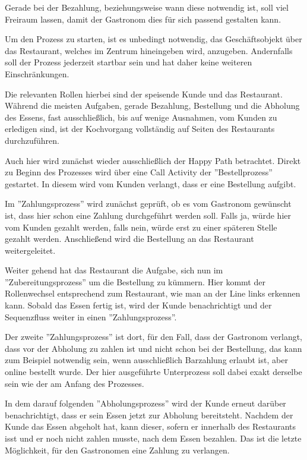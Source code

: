 Gerade bei der Bezahlung, beziehungsweise wann diese notwendig ist, soll viel Freiraum lassen, damit der Gastronom dies für sich passend gestalten kann.

Um den Prozess zu starten, ist es unbedingt notwendig, das Geschäftsobjekt über das Restaurant, welches im Zentrum hineingeben wird, anzugeben. Andernfalls soll der Prozess jederzeit startbar sein und hat daher keine weiteren Einschränkungen.

Die relevanten Rollen hierbei sind der speisende Kunde und das Restaurant.
Während die meisten Aufgaben, gerade Bezahlung, Bestellung und die Abholung des Essens, fast ausschließlich, bis auf wenige Ausnahmen, vom Kunden zu erledigen sind, ist der Kochvorgang vollständig auf Seiten des Restaurants durchzuführen.

\clearpage
{}

Auch hier wird zunächst wieder ausschließlich der Happy Path betrachtet. Direkt zu Beginn des Prozesses wird über eine Call Activity der ''Bestellprozess'' gestartet. In diesem wird vom Kunden verlangt, dass er eine Bestellung aufgibt. 

Im ''Zahlungsprozess'' wird zunächst geprüft, ob es vom Gastronom gewünscht ist, dass hier schon eine Zahlung durchgeführt werden soll. Falls ja, würde hier vom Kunden gezahlt werden, falls nein, würde erst zu einer späteren Stelle gezahlt werden. Anschließend wird die Bestellung an das Restaurant weitergeleitet.

Weiter gehend hat das Restaurant die Aufgabe, sich nun im ''Zubereitungsprozess'' um die Bestellung zu kümmern. Hier kommt der Rollenwechsel entsprechend zum Restaurant, wie man an der Line links erkennen kann. Sobald das Essen fertig ist, wird der Kunde benachrichtigt und der Sequenzfluss weiter in einen ''Zahlungsprozess''. 

Der zweite ''Zahlungsprozess'' ist dort, für den Fall, dass der Gastronom verlangt, dass vor der Abholung zu zahlen ist und nicht schon bei der Bestellung, das kann zum Beispiel notwendig sein, wenn ausschließlich Barzahlung erlaubt ist, aber online bestellt wurde. Der hier ausgeführte Unterprozess soll dabei exakt derselbe sein wie der am Anfang des Prozesses.

In dem darauf folgenden ''Abholungsprozess'' wird der Kunde erneut darüber benachrichtigt, dass er sein Essen jetzt zur Abholung bereitsteht. Nachdem der Kunde das Essen abgeholt hat, kann dieser, sofern er innerhalb des Restaurants isst und er noch nicht zahlen musste, nach dem Essen bezahlen. Das ist die letzte Möglichkeit, für den Gastronomen eine Zahlung zu verlangen.

